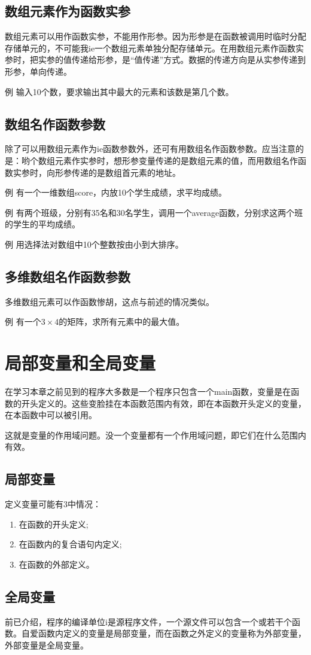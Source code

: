\subsection{数组元素作为函数实参}
数组元素可以用作函数实参，不能用作形参。因为形参是在函数被调用时临时分配存储单元的，不可能我ie一个数组元素单独分配存储单元。在用数组元素作函数实参时，把实参的值传递给形参，是“值传递”方式。数据的传递方向是从实参传递到形参，单向传递。

例 输入10个数，要求输出其中最大的元素和该数是第几个数。
\subsection{数组名作函数参数}
除了可以用数组元素作为ie函数参数外，还可有用数组名作函数参数。应当注意的是：哟个数组元素作实参时，想形参变量传递的是数组元素的值，而用数组名作函数实参时，向形参传递的是数组首元素的地址。

例 有一个一维数组score，内放10个学生成绩，求平均成绩。

例 有两个班级，分别有35名和30名学生，调用一个average函数，分别求这两个班的学生的平均成绩。

例 用选择法对数组中10个整数按由小到大排序。
\subsection{多维数组名作函数参数}
多维数组元素可以作函数惨胡，这点与前述的情况类似。

例 有一个$3 \times 4$的矩阵，求所有元素中的最大值。
\section{局部变量和全局变量}
在学习本章之前见到的程序大多数是一个程序只包含一个main函数，变量是在函数的开头定义的。这些变脸挂在本函数范围内有效，即在本函数开头定义的变量，在本函数中可以被引用。

这就是变量的作用域问题。没一个变量都有一个作用域问题，即它们在什么范围内有效。
\subsection{局部变量}
定义变量可能有3中情况：
\begin{enumerate}
	\item 在函数的开头定义;
	\item 在函数内的复合语句内定义;
	\item 在函数的外部定义。
\end{enumerate}
\subsection{全局变量}
前已介绍，程序的编译单位i是源程序文件，一个源文件可以包含一个或若干个函数。自爱函数内定义的变量是局部变量，而在函数之外定义的变量称为外部变量，外部变量是全局变量。

